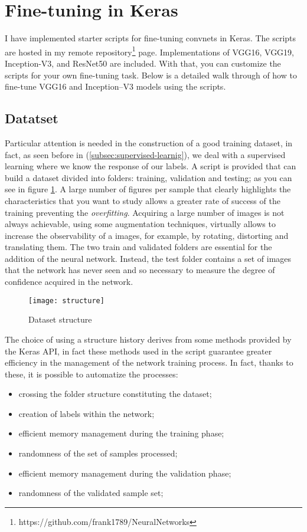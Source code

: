 \section{Fine-tuning in Keras}
\label{sec:finetuningkeras}
%
I have implemented starter scripts for fine-tuning convnets in Keras. 
The scripts are hosted in my remote 
repository\footnote{https://github.com/frank1789/NeuralNetworks} page.
Implementations of VGG16, VGG19, Inception-V3, and ResNet50 are included. 
With that, you can customize the scripts for your own fine-tuning task.
Below is a detailed walk through of how to fine-tune VGG16 and Inception--V3 
models using the scripts.
%
\subsection{Datatset}
\label{subsec:dataset}
Particular attention is needed in the construction of a good training dataset, 
in fact, as seen before in (\ref{subsec:supervised-learnig}), we deal with a 
supervised learning where we know the response of our labels.
A script is provided that can build a dataset divided into folders: training, 
validation and testing; as you can see in figure \ref{fig:datasetstructure}.
A large number of figures per sample that clearly highlights the characteristics 
that you want to study allows a greater rate of success of the training 
preventing the \emph{overfitting}.
Acquiring a large number of images is not always achievable, using some 
augmentation techniques, virtually allows to increase the observability of a 
images, for example, by rotating, distorting and translating them.
The two train and validated folders are essential for the addition of the 
neural network.
Instead, the test folder contains a set of images that the network has never 
seen and so necessary to measure the degree of confidence acquired in the network.
%
\begin{figure}[htb]
\centering
\texttt{[image: structure]}
\caption{Dataset structure}
\label{fig:datasetstructure}
\end{figure}
%
The choice of using a structure history derives from some methods provided by 
the Keras API, in fact these methods used in the script guarantee greater 
efficiency in the management of the network training process.
In fact, thanks to these, it is possible to automatize the processes:
\begin{itemize}
\item crossing the folder structure constituting the dataset;
\item creation of labels within the network;
\item efficient memory management during the training phase;
\item randomness of the set of samples processed;
\item efficient memory management during the validation phase;
\item randomness of the validated sample set;
\end{itemize}
%
